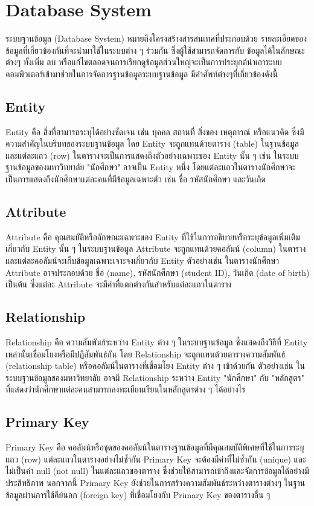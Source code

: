 \section{Database System}
  \qquad ระบบฐานข้อมูล (Database System) หมายถึงโครงสร้างสารสนเทศที่ประกอบด้วย รายละเอียดของข้อมูลที่เกี่ยวข้องกันที่จะนำมาใช้ในระบบต่าง ๆ ร่วมกัน ซึ่งผู้ใช้สามารถจัดการกับ ข้อมูลได้ในลักษณะต่างๆ ทั้งเพิ่ม ลบ หรือแก้ไขตลอดจนการเรียกดูข้อมูลส่วนใหญ่จะเป็นการประยุกต์นำเอาระบบคอมพิวเตอร์เข้ามาช่วยในการจัดการฐานข้อมูลระบบฐานข้อมูล มีคําศัพท์ต่างๆที่เกี่ยวข้องดังนี้
  \subsection{Entity}
    \qquad Entity คือ สิ่งที่สามารถระบุได้อย่างชัดเจน เช่น บุคคล สถานที่ สิ่งของ เหตุการณ์ หรือแนวคิด ซึ่งมีความสำคัญในบริบทของระบบฐานข้อมูล โดย Entity จะถูกแทนด้วยตาราง (table) ในฐานข้อมูล และแต่ละแถว (row) ในตารางจะเป็นการแสดงถึงตัวอย่างเฉพาะของ Entity นั้น ๆ เช่น ในระบบฐานข้อมูลของมหาวิทยาลัย "นักศึกษา" อาจเป็น Entity หนึ่ง โดยแต่ละแถวในตารางนักศึกษาจะเป็นการแสดงถึงนักศึกษาแต่ละคนที่มีข้อมูลเฉพาะตัว เช่น ชื่อ รหัสนักศึกษา และวันเกิด
  \subsection{Attribute}
    \qquad Attribute คือ คุณสมบัติหรือลักษณะเฉพาะของ Entity ที่ใช้ในการอธิบายหรือระบุข้อมูลเพิ่มเติมเกี่ยวกับ Entity นั้น ๆ ในระบบฐานข้อมูล Attribute จะถูกแทนด้วยคอลัมน์ (column) ในตาราง และแต่ละคอลัมน์จะเก็บข้อมูลเฉพาะเจาะจงเกี่ยวกับ Entity ตัวอย่างเช่น ในตารางนักศึกษา Attribute อาจประกอบด้วย ชื่อ (name), รหัสนักศึกษา (student ID), วันเกิด (date of birth) เป็นต้น ซึ่งแต่ละ Attribute จะมีค่าที่แตกต่างกันสำหรับแต่ละแถวในตาราง
  \subsection{Relationship}
    \qquad Relationship คือ ความสัมพันธ์ระหว่าง Entity ต่าง ๆ ในระบบฐานข้อมูล ซึ่งแสดงถึงวิธีที่ Entity เหล่านั้นเชื่อมโยงหรือมีปฏิสัมพันธ์กัน โดย Relationship จะถูกแทนด้วยตารางความสัมพันธ์ (relationship table) หรือคอลัมน์ในตารางที่เชื่อมโยง Entity ต่าง ๆ เข้าด้วยกัน ตัวอย่างเช่น ในระบบฐานข้อมูลของมหาวิทยาลัย อาจมี Relationship ระหว่าง Entity "นักศึกษา" กับ "หลักสูตร" ที่แสดงว่านักศึกษาแต่ละคนสามารถลงทะเบียนเรียนในหลักสูตรต่าง ๆ ได้อย่างไร
  \subsection{Primary Key}
    \qquad Primary Key คือ คอลัมน์หรือชุดของคอลัมน์ในตารางฐานข้อมูลที่มีคุณสมบัติพิเศษที่ใช้ในการระบุแถว (row) แต่ละแถวในตารางอย่างไม่ซ้ำกัน Primary Key จะต้องมีค่าที่ไม่ซ้ำกัน (unique) และไม่เป็นค่า null (not null) ในแต่ละแถวของตาราง ซึ่งช่วยให้สามารถเข้าถึงและจัดการข้อมูลได้อย่างมีประสิทธิภาพ นอกจากนี้ Primary Key ยังช่วยในการสร้างความสัมพันธ์ระหว่างตารางต่างๆ ในฐานข้อมูลผ่านการใช้คีย์นอก (foreign key) ที่เชื่อมโยงกับ Primary Key ของตารางอื่น ๆ
